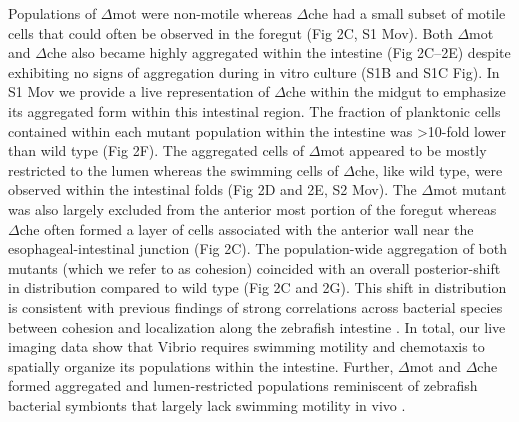Populations of $\Delta$mot were non-motile whereas $\Delta$che had a small subset of motile cells that could often be observed in the foregut (Fig 2C, S1 Mov). Both $\Delta$mot and $\Delta$che also became highly aggregated within the intestine (Fig 2C–2E) despite exhibiting no signs of aggregation during in vitro culture (S1B and S1C Fig). In S1 Mov we provide a live representation of $\Delta$che within the midgut to emphasize its aggregated form within this intestinal region. The fraction of planktonic cells contained within each mutant population within the intestine was >10-fold lower than wild type (Fig 2F). The aggregated cells of $\Delta$mot appeared to be mostly restricted to the lumen whereas the swimming cells of $\Delta$che, like wild type, were observed within the intestinal folds (Fig 2D and 2E, S2 Mov). The $\Delta$mot mutant was also largely excluded from the anterior most portion of the foregut whereas $\Delta$che often formed a layer of cells associated with the anterior wall near the esophageal-intestinal junction (Fig 2C). The population-wide aggregation of both mutants (which we refer to as cohesion) coincided with an overall posterior-shift in distribution compared to wild type (Fig 2C and 2G). This shift in distribution is consistent with previous findings of strong correlations across bacterial species between cohesion and localization along the zebrafish intestine \cite{schlomann_bacterial_2018}. In total, our live imaging data show that Vibrio requires swimming motility and chemotaxis to spatially organize its populations within the intestine. Further, $\Delta$mot and $\Delta$che formed aggregated and lumen-restricted populations reminiscent of zebrafish bacterial symbionts that largely lack swimming motility in vivo \cite{wiles_modernized_2018,schlomann_bacterial_2018}. 



